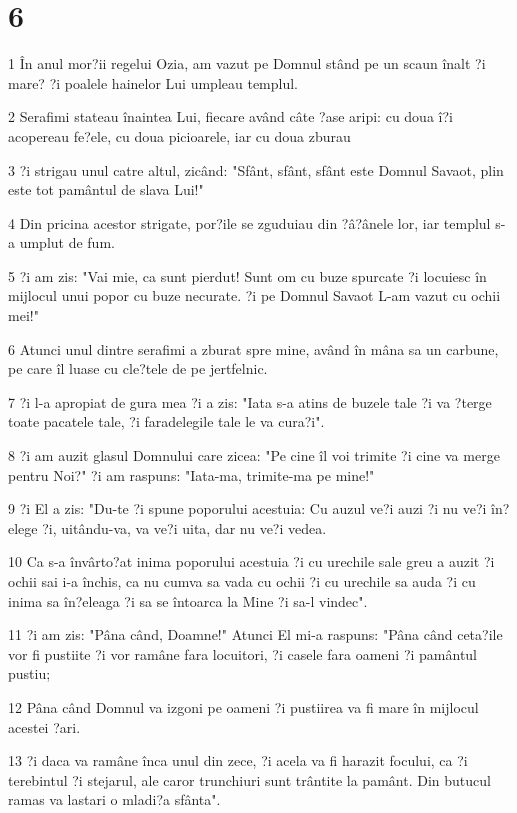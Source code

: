 \chapter{6}

\par 1 În anul mor?ii regelui Ozia, am vazut pe Domnul stând pe un scaun înalt ?i mare? ?i poalele hainelor Lui umpleau templul.
\par 2 Serafimi stateau înaintea Lui, fiecare având câte ?ase aripi: cu doua î?i acopereau fe?ele, cu doua picioarele, iar cu doua zburau
\par 3 ?i strigau unul catre altul, zicând: "Sfânt, sfânt, sfânt este Domnul Savaot, plin este tot pamântul de slava Lui!"
\par 4 Din pricina acestor strigate, por?ile se zguduiau din ?â?ânele lor, iar templul s-a umplut de fum.
\par 5 ?i am zis: "Vai mie, ca sunt pierdut! Sunt om cu buze spurcate ?i locuiesc în mijlocul unui popor cu buze necurate. ?i pe Domnul Savaot L-am vazut cu ochii mei!"
\par 6 Atunci unul dintre serafimi a zburat spre mine, având în mâna sa un carbune, pe care îl luase cu cle?tele de pe jertfelnic.
\par 7 ?i l-a apropiat de gura mea ?i a zis: "Iata s-a atins de buzele tale ?i va ?terge toate pacatele tale, ?i faradelegile tale le va cura?i".
\par 8 ?i am auzit glasul Domnului care zicea: "Pe cine îl voi trimite ?i cine va merge pentru Noi?" ?i am raspuns: "Iata-ma, trimite-ma pe mine!"
\par 9 ?i El a zis: "Du-te ?i spune poporului acestuia: Cu auzul ve?i auzi ?i nu ve?i în?elege ?i, uitându-va, va ve?i uita, dar nu ve?i vedea.
\par 10 Ca s-a învârto?at inima poporului acestuia ?i cu urechile sale greu a auzit ?i ochii sai i-a închis, ca nu cumva sa vada cu ochii ?i cu urechile sa auda ?i cu inima sa în?eleaga ?i sa se întoarca la Mine ?i sa-l vindec".
\par 11 ?i am zis: "Pâna când, Doamne!" Atunci El mi-a raspuns: "Pâna când ceta?ile vor fi pustiite ?i vor ramâne fara locuitori, ?i casele fara oameni ?i pamântul pustiu;
\par 12 Pâna când Domnul va izgoni pe oameni ?i pustiirea va fi mare în mijlocul acestei ?ari.
\par 13 ?i daca va ramâne înca unul din zece, ?i acela va fi harazit focului, ca ?i terebintul ?i stejarul, ale caror trunchiuri sunt trântite la pamânt. Din butucul ramas va lastari o mladi?a sfânta".

